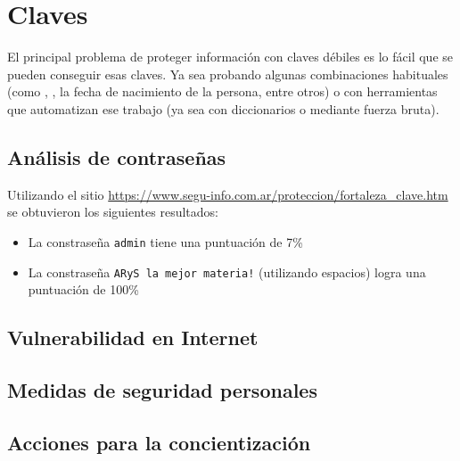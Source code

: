 \section{Claves}

El principal problema de proteger información con claves débiles es lo fácil que se pueden conseguir esas claves. Ya sea probando algunas combinaciones habituales (como , , la fecha de nacimiento de la persona, entre otros) o con herramientas que automatizan ese trabajo (ya sea con diccionarios o mediante fuerza bruta).

\subsection{Análisis de contraseñas}

Utilizando el sitio \url{https://www.segu-info.com.ar/proteccion/fortaleza_clave.htm} se obtuvieron los siguientes resultados:

\begin{itemize}
    \item La constraseña \texttt{admin} tiene una puntuación de 7\% 
    \item La constraseña \texttt{ARyS la mejor materia!} (utilizando espacios) logra una puntuación de 100\% 
\end{itemize}

\subsection{Vulnerabilidad en Internet}

\subsection{Medidas de seguridad personales}

\subsection{Acciones para la concientización}



















\clearpage
\printbibliography



